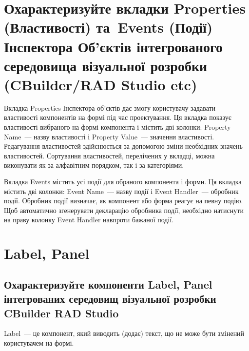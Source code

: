 \documentclass[
	a4paper,
	oneside,
	BCOR = 10mm,
	DIV = 12,
	12pt,
	headings = normal,
]{scrartcl}
\begin{document}
	\section{Охарактеризуйте вкладки \textenglish{Properties} (Властивості) та~\textenglish{Events} (Події) Інспектора Об'єктів інтегрованого середовища візуальної розробки (\textenglish{CBuilder/RAD Studio etc})}
		Вкладка \textenglish{Properties} Інспектора об'єктів дає змогу користувачу задавати властивості компонентів на формі під час проектування. Ця вкладка показує властивості вибраного на формі компонента і містить дві колонки: \textenglish{Property Name}~— назву властивості і \textenglish{Property Value}~— значення властивості. Редагування властивостей здійснюється за допомогою зміни необхідних значень властивостей. Сортування властивостей, перелічених у вкладці, можна виконувати як за алфавітним порядком, так і за категоріями.

		Вкладка \textenglish{Events} містить усі події для обраного компонента і форми. Ця вкладка містить дві колонки: \textenglish{Event Name}~— назву події і \textenglish{Event Handler}~— обробник події. Обробник події визначає, як компонент або форма реагує на певну подію. Щоб автоматично згенерувати декларацію обробника події, необхідно натиснути на праву колонку \textenglish{Event Handler} навпроти бажаної події.

	\section{\textenglish{Label, Panel}}
		\subsection{Охарактеризуйте компоненти \textenglish{Label, Panel} інтегрованих середовищ візуальної розробки \textenglish{CBuilder RAD Studio}}
			\textenglish{Label}~— це компонент, який виводить (додає) текст, що не може бути змінений користувачем на формі.
\end{document}
